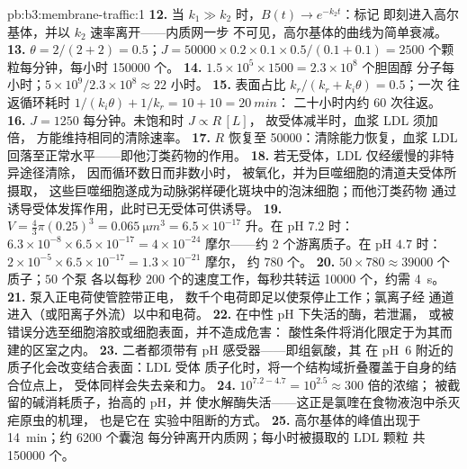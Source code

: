 \begin{solution}{pb:b3:membrane-traffic:1}
\textbf{12.} 当 $k_{1} \gg k_{2}$ 时，$B(t) \to e^{-k_{2}t}$：标记
即刻进入高尔基体，并以 $k_{2}$ 速率离开——内质网一步
不可见，高尔基体的曲线为简单衰减。
\textbf{13.} $\theta = 2/(2+2) = 0.5$；$J = \num{50000}\times 0.2\times
0.1\times 0.5/(0.1 + 0.1) = 2500$ 个颗粒每分钟，每小时
\num{150000} 个。
\textbf{14.} $1.5\times 10^{5}\times 1500 = 2.3\times 10^{8}$ 个胆固醇
分子每小时；$5\times 10^{9}/2.3\times 10^{8} \approx 22$ 小时。
\textbf{15.} 表面占比 $k_{r}/(k_{r} + k_{i}\theta) = 0.5$；一次
往返循环耗时 $1/(k_{i}\theta) + 1/k_{r} = 10 + 10 = \qty{20}{min}$：
二十小时内约 $60$ 次往返。
\textbf{16.} $J = 1250$ 每分钟。未饱和时 $J \propto R\,[L]$，
故受体减半时，血浆 LDL 须加倍，
方能维持相同的清除速率。
\textbf{17.} $R$ 恢复至 \num{50000}：清除能力恢复，血浆 LDL
回落至正常水平——即他汀类药物的作用。
\textbf{18.} 若无受体，LDL 仅经缓慢的非特异途径清除，
因而循环数日而非数小时，
被氧化，并为巨噬细胞的清道夫受体所摄取，
这些巨噬细胞遂成为动脉粥样硬化斑块中的泡沫细胞；而他汀类药物
通过诱导受体发挥作用，此时已无受体可供诱导。
\textbf{19.} $V = \tfrac{4}{3}\pi(0.25)^{3} = \qty{0.065}{\micro m^3} =
6.5\times 10^{-17}$ 升。在 pH $7.2$ 时：$6.3\times 10^{-8}\times 6.5\times
10^{-17} = 4\times 10^{-24}$ 摩尔——约 $2$ 个游离质子。在 pH $4.7$ 时：
$2\times 10^{-5}\times 6.5\times 10^{-17} = 1.3\times 10^{-21}$ 摩尔，
约 $780$ 个。
\textbf{20.} $50\times 780 \approx \num{39000}$ 个质子；$50$ 个泵
各以每秒 $200$ 个的速度工作，每秒共转运 \num{10000} 个，约需 \qty{4}{s}。
\textbf{21.} 泵入正电荷使管腔带正电，
数千个电荷即足以使泵停止工作；氯离子经
通道进入（或阳离子外流）以中和电荷。
\textbf{22.} 在中性 pH 下失活的酶，若泄漏，
或被错误分选至细胞溶胶或细胞表面，并不造成危害：
酸性条件将消化限定于为其而建的区室之内。
\textbf{23.} 二者都须带有 pH 感受器——即组氨酸，其
在 pH~6 附近的质子化会改变结合表面：LDL 受体
质子化时，将一个结构域折叠覆盖于自身的结合位点上，
受体同样会失去亲和力。
\textbf{24.} $10^{7.2 - 4.7} = 10^{2.5} \approx 300$ 倍的浓缩；
被截留的碱消耗质子，抬高的 pH，并
使水解酶失活——这正是氯喹在食物液泡中杀灭疟原虫的机理，
也是它在
实验中阻断的方式。
\textbf{25.} 高尔基体的峰值出现于 \qty{14}{min}；约 \num{6200} 个囊泡
每分钟离开内质网；每小时被摄取的 LDL 颗粒
共 \num{150000} 个。
\end{solution}
